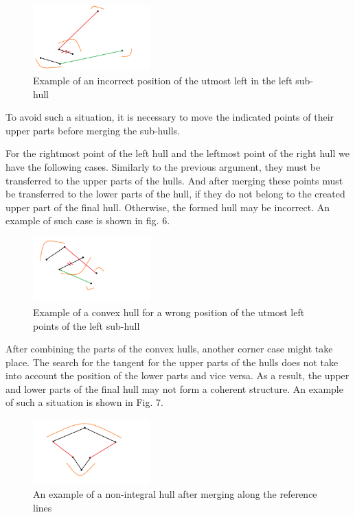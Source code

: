 \documentclass[conference]{IEEEtran}
\theoremstyle{plane}
\begin{document}
\begin{figure}[htbp]
	\centerline{\includegraphics[width=0.4\textwidth, height=0.2\textheight]{incorect_search}}
	\caption{Example of an incorrect position of the utmost left in the left sub-hull}
	\label{incorect_search}
\end{figure}

To avoid such a situation, it is necessary to move the indicated points of their upper parts before merging the sub-hulls.

For the rightmost point of the left hull and the leftmost point of the right hull we have the following cases. Similarly to the previous argument, they must be transferred to the upper parts of the hulls. And after merging these points must be transferred to the lower parts of the hull, if they do not belong to the created upper part of the final hull. Otherwise, the formed hull may be incorrect. An example of such case is shown in fig. 6.


\begin{figure}[htbp]
	\centerline{\includegraphics[width=0.4\textwidth, height=0.2\textheight]{incorect_edge_points}}
	\caption{Example of a convex hull for a wrong position of the utmost left points of the left sub-hull}
	\label{incorect_edge_points}
\end{figure}

After combining the parts of the convex hulls, another corner case might take place. The search for the tangent for the upper parts of the hulls does not take into account the position of the lower parts and vice versa. As a result, the upper and lower parts of the final hull may not form a coherent structure. An example of such a situation is shown in Fig. 7.

\begin{figure}[htbp]
	\centerline{\includegraphics[width=0.4\textwidth, height=0.2\textheight]{incorect_lower_subhull}}
	\caption{An example of a non-integral hull after merging along the reference lines}
	\label{incorect_lower_subhull}
\end{figure}
\end{document}
